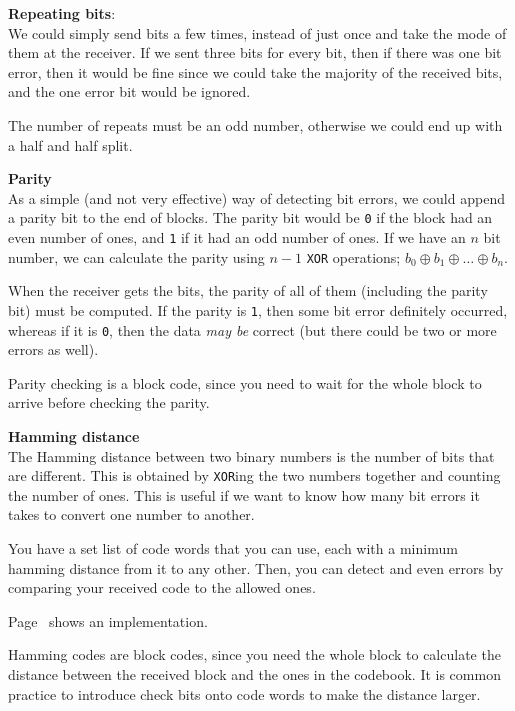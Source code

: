 \begin{description}
  \item \textbf{Repeating bits}:\\
    We could simply send bits a few times, instead of just once and take the 
    mode of them at the receiver. If we sent three bits for every bit, then
    if there was one bit error, then it would be fine since we could take the 
    majority of the received bits, and the one error bit would be ignored.

    The number of repeats must be an odd number, otherwise we could end up with 
    a half and half split.
  \item \textbf{Parity}\\
    As a simple (and not very effective) way of detecting bit errors, we could
    append a parity bit to the end of blocks. The parity bit would be \texttt{0}
    if the block had an even number of ones, and \texttt{1} if it had an odd
    number of ones. If we have an $n$ bit number, we can calculate the parity
    using $n - 1$ \texttt{XOR} operations; $b_0 \oplus b_1 \oplus \dots \oplus
    b_n$.

    When the receiver gets the bits, the parity of all of them (including the
    parity bit) must be computed. If the parity is \texttt{1}, then some bit
    error definitely occurred, whereas if it is \texttt{0}, then the data
    \textit{may be} correct (but there could be two or more errors as well).

    Parity checking is a block code, since you need to wait for the whole block
    to arrive before checking the parity.
  \item \textbf{Hamming distance}\\
    The Hamming distance between two binary numbers is the number of bits that
    are different. This is obtained by \texttt{XOR}ing the two numbers together
    and counting the number of ones. This is useful if we want to know how many
    bit errors it takes to convert one number to another.

    You have a set list of code words that you can use, each with a minimum
    hamming distance from it to any other. Then, you can detect and even errors
    by comparing your received code to the allowed ones.

    Page~\pageref{HammingCodes} shows an implementation.

    Hamming codes are block codes, since you need the whole block to calculate
    the distance between the received block and the ones in the codebook. It is
    common practice to introduce check bits onto code words to make the distance
    larger.


\end{description}
